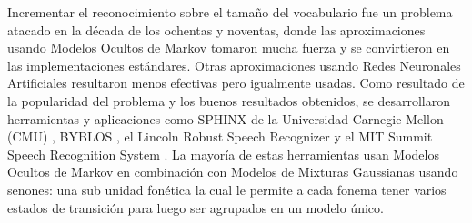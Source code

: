 Incrementar el reconocimiento sobre el tamaño del vocabulario fue un problema atacado en la década de los ochentas y noventas, donde las aproximaciones usando Modelos Ocultos de Markov tomaron mucha fuerza \cite{RabinerARecognition} y se convirtieron en las implementaciones estándares. Otras aproximaciones usando Redes Neuronales Artificiales resultaron menos efectivas \cite{Waibel1989PhonemeNetworks} pero igualmente usadas. Como resultado de la popularidad del problema y los buenos resultados obtenidos, se desarrollaron herramientas y aplicaciones como SPHINX de la Universidad Carnegie Mellon (CMU) \cite{Lee1990AnSystem}, BYBLOS \cite{ChowBYBLOS:System}, el Lincoln Robust Speech Recognizer \cite{PaulTheRecognizer} y el MIT Summit Speech Recognition System \cite{Zue1989TheReport}. La mayoría de estas herramientas usan Modelos Ocultos de Markov en combinación con Modelos de Mixturas Gaussianas usando senones: una sub unidad fonética la cual le permite a cada fonema tener varios estados de transición para luego ser agrupados en un modelo único.

